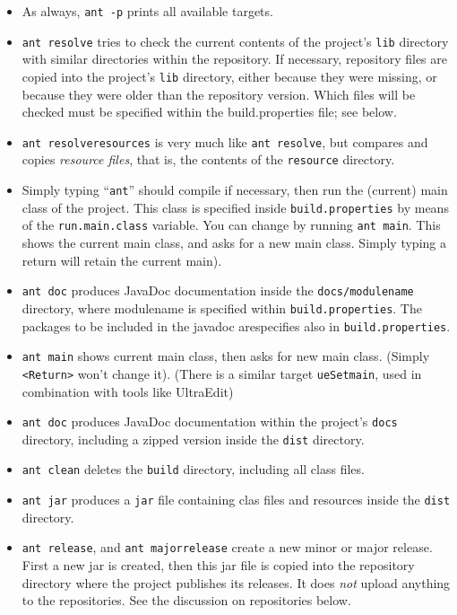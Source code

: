 \begin{itemize}
\item As always, \verb#ant -p# prints all available targets.
\item \verb#ant resolve# tries to check the current contents of the project's \verb#lib#
directory with similar directories within the repository. If necessary, repository files are copied into
the project's \verb#lib# directory, either because they were missing, or because they were
older than the repository version. Which files will be checked must be specified
within the build.properties file; see below.
\item \verb#ant resolveresources# is very much like \verb#ant resolve#, but compares and copies
\emph{resource files}, that is, the contents of the \verb#resource# directory.

\item Simply typing ``\verb#ant#'' should compile if necessary, then run the (current) main class of the project.
This class is specified inside \verb#build.properties# by means of the \verb#run.main.class# variable.
You can change by running \verb"ant main". This shows the current main class, and asks for a new main class.
Simply typing a return will retain the current main).

\item \verb"ant doc" produces JavaDoc documentation inside the \verb"docs/modulename" directory,
where modulename is specified within \verb"build.properties".
The packages to be included in the javadoc arespecifies also in
\verb"build.properties".

\item \verb#ant main# shows current main class, then asks for new main class. (Simply \verb#<Return># won't change it).
(There is a similar target \verb#ueSetmain#, used in combination with tools like UltraEdit)
\item \verb#ant doc# produces JavaDoc documentation within the project's \verb#docs# directory,
including a zipped version inside the \verb#dist# directory.
\item \verb#ant clean# deletes the \verb#build# directory, including all class files.
\item \verb#ant jar# produces a \verb"jar" file containing clas files and resources inside the \verb#dist# directory.


\item  \verb"ant release", and \verb"ant majorrelease"
create  a new minor or major release. 
First a new jar is created, then this jar file is copied into the repository directory where the project
 publishes its releases.
It does \emph{not} upload anything to the repositories.
See the discussion on repositories below.


\end{itemize}
